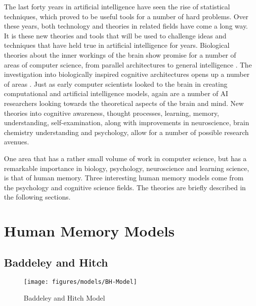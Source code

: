 The last forty years in artificial
intelligence have seen the rise of statistical techniques, which proved to be
useful tools for a number of hard problems. Over these years, both technology
and theories in related fields have come a long way.  It is these new theories
and tools that will be used to challenge ideas and techniques that have held
true in artificial intelligence for years.  Biological theories about the inner
workings of the brain show promise for a number of areas of computer science,
from parallel architectures to general intelligence \cite{TOBICA, ERSATZ}.  The
investigation into biologically inspired cognitive architectures opens up a
number of areas \cite{BICA}.  Just as early computer scientists looked to the
brain in creating computational and artificial intelligence models, again are a
number of AI researchers looking towards the theoretical aspects of the brain
and mind.  New theories into cognitive awareness, thought processes, learning,
memory, understanding, self-examination, along with improvements in
neuroscience, brain chemistry understanding and psychology, allow for a number
of possible research avenues. 

One area that has a rather small volume of work
in computer science, but has a remarkable importance in biology, psychology,
neuroscience and learning science, is that of human memory.  Three interesting
human memory models come from the psychology and cognitive science fields.  The
theories are briefly described in the following sections. 

\section{Human Memory Models}

\subsection{Baddeley and Hitch} 
\begin{figure}[htp]
	\begin{center}
		\texttt{[image: figures/models/BH-Model]}
		\caption{Baddeley and Hitch Model}     
	\end{center}     
	\label{fig:BH_MODEL}
\end{figure} 


